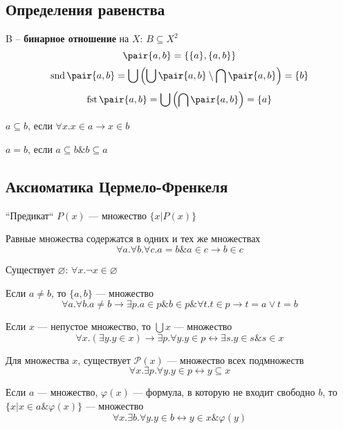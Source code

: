 \documentclass[english]{article}
\begin{document}
\subsection{Определения равенства}
\label{sec:orgc8c5c2c}
\begin{definition}
	B -- \textbf{бинарное отношение} на \(X\): \(B \subseteq X^2\)
	\[ \pair{a, b} = \{\{a\}, \{a, b\}\} \]
	\[ \mathop{\rm snd}\pair{a, b} = \bigcup\left(\bigcup \pair{a, b} \setminus \bigcap \pair{a, b}\right) = \{b\} \]
	\[ \mathop{\rm fst}\pair{a, b} = \bigcup\left(\bigcap \pair{a, b}\right) = \{a\} \]
	\label{org035dde5}
\end{definition}
\begin{definition}
	\(a \subseteq b\), если \(\forall x. x \in a \to x \in b\)
	\label{org0c79125}
\end{definition}
\begin{definition}
	\(a = b\), если \(a \subseteq b \& b \subseteq a\)
	\label{org43d75af}
\end{definition}
\subsection{Аксиоматика Цермело-Френкеля}
\label{sec:orgb810827}
\begin{definition}
	``Предикат`` \(P(x)\) --- множество \(\{x \big| P(x)\}\)
	\label{org61b3629}
\end{definition}
\begin{axiom}[равенства]
	Равные множества содержатся в одних и тех же множествах
	\[ \forall a.\forall b.\forall c. a = b\&a\in c\to b \in c \]
	\label{orgefe0349}
\end{axiom}
\begin{axiom}
	Существует \(\varnothing\): \(\forall x. \neg x \in \varnothing\)
	\label{org9ef4887}
\end{axiom}
\begin{axiom}[пары]
	Если \(a \neq b\), то \(\{a, b\}\) --- множество
	\[ \forall a. \forall b. a\neq b \to \exists p. a \in p \& b\in p \& \forall t. t \in p \to t = a \vee t = b \]
	\label{org745f232}
\end{axiom}
\begin{axiom}[объединения]
	Если \(x\) --- непустое множество, то \(\bigcup x\) --- множество
	\[ \forall x. (\exists y. y \in x) \to \exists p. \forall y. y\in p \leftrightarrow \exists s. y \in s \& s \in x \]
	\label{orga00ff60}
\end{axiom}
\begin{axiom}[Степени]
	Для множества \(x\), существует \(\mathcal{P}(x)\) --- множество всех подмножеств
	\[ \forall x. \exists p. \forall y. y\in p \leftrightarrow y \subseteq x  \]
	\label{org0867fb7}
\end{axiom}
\begin{axiom}
	Если \(a\) --- множество, \(\varphi(x)\) --- формула, в которую не входит свободно \(b\), то \(\{x \big| x \in a \& \varphi(x)\}\) --- множество
	\[ \forall x. \exists b. \forall y. y \in b \leftrightarrow y \in x \& \varphi(y) \]
	\label{orgb9c218a}
\end{axiom}
\end{document}

